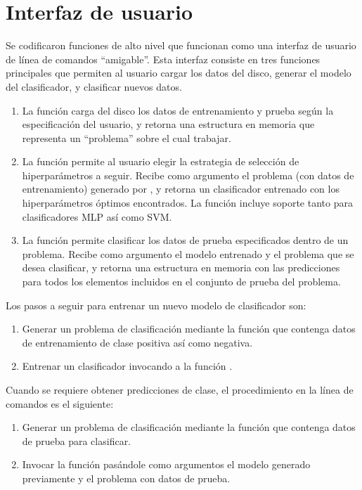 %
%
%
\section{Interfaz de usuario}
%
Se codificaron funciones de alto nivel que funcionan como una interfaz
de usuario de línea de comandos ``amigable''.
Esta interfaz consiste en tres funciones principales que permiten al
usuario cargar los datos del disco, generar el modelo del
clasificador, y clasificar nuevos datos.
%
\begin{enumerate}
\item
  La función  carga del disco los datos de
  entrenamiento y prueba según la especificación del usuario, y
  retorna una estructura en memoria que representa un ``problema''
  sobre el cual trabajar.
\item
  La función  permite al usuario elegir la
  estrategia de selección de hiperparámetros a seguir.
  Recibe como argumento el problema (con datos de entrenamiento)
  generado por , y retorna un clasificador
  entrenado con los hiperparámetros óptimos encontrados.
  La función incluye soporte tanto para clasificadores MLP así como SVM.
\item
  La función  permite clasificar los datos de prueba
  especificados dentro de un problema.
  Recibe como argumento el modelo entrenado y el problema que se desea
  clasificar, y retorna una estructura en memoria con las predicciones
  para todos los elementos incluidos en el conjunto de prueba del
  problema.
\end{enumerate}
%
Los pasos a seguir para entrenar un nuevo modelo de clasificador
son:
%
\begin{enumerate}
\item Generar un problema de clasificación mediante la función
   que contenga datos de entrenamiento de clase
  positiva así como negativa.
\item Entrenar un clasificador invocando a la función
  .
\end{enumerate}
%
Cuando se requiere obtener predicciones de clase, el procedimiento
en la línea de comandos es el siguiente:
%
\begin{enumerate}
\item Generar un problema de clasificación mediante la función
   que contenga datos de prueba para clasificar.
\item Invocar la función  pasándole como argumentos
  el modelo generado previamente y el problema con datos de prueba.
\end{enumerate}
%
